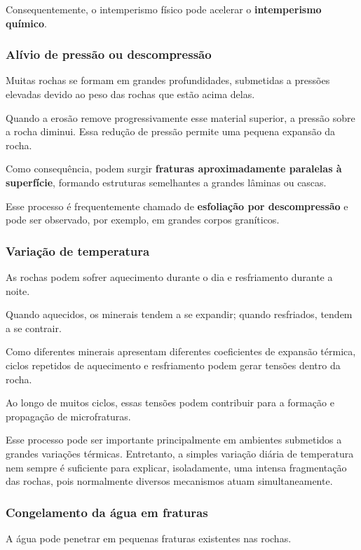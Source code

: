 \documentclass[a4paper,12pt]{article}
\theoremstyle{definition}
\theoremstyle{definition}
\theoremstyle{definition}
\begin{document}
Consequentemente, o intemperismo físico pode acelerar o \textbf{intemperismo químico}.

\subsubsection{Alívio de pressão ou descompressão}

Muitas rochas se formam em grandes profundidades, submetidas a pressões elevadas devido ao peso das rochas que estão acima delas.

Quando a erosão remove progressivamente esse material superior, a pressão sobre a rocha diminui. Essa redução de pressão permite uma pequena expansão da rocha.

Como consequência, podem surgir \textbf{fraturas aproximadamente paralelas à superfície}, formando estruturas semelhantes a grandes lâminas ou cascas.

Esse processo é frequentemente chamado de \textbf{esfoliação por descompressão} e pode ser observado, por exemplo, em grandes corpos graníticos.

\subsubsection{Variação de temperatura}

As rochas podem sofrer aquecimento durante o dia e resfriamento durante a noite.

Quando aquecidos, os minerais tendem a se expandir; quando resfriados, tendem a se contrair.

Como diferentes minerais apresentam diferentes coeficientes de expansão térmica, ciclos repetidos de aquecimento e resfriamento podem gerar tensões dentro da rocha.

Ao longo de muitos ciclos, essas tensões podem contribuir para a formação e propagação de microfraturas.

Esse processo pode ser importante principalmente em ambientes submetidos a grandes variações térmicas. Entretanto, a simples variação diária de temperatura nem sempre é suficiente para explicar, isoladamente, uma intensa fragmentação das rochas, pois normalmente diversos mecanismos atuam simultaneamente.

\subsubsection{Congelamento da água em fraturas}

A água pode penetrar em pequenas fraturas existentes nas rochas.
\end{document}
